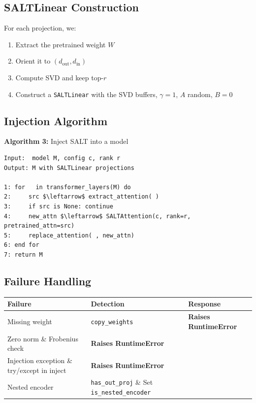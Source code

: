 \subsection{SALTLinear Construction}

For each projection, we:

\begin{enumerate}
\item Extract the pretrained weight $W$
\item Orient it to $(d_\text{out}, d_\text{in})$
\item Compute SVD and keep top-$r$
\item Construct a \texttt{SALTLinear} with the SVD buffers, $\gamma = 1$, $A$ random,
  $B = 0$

\end{enumerate}
\subsection{Injection Algorithm}

\textbf{Algorithm 3:} Inject SALT into a model
\begin{lstlisting}
Input:  model M, config c, rank r
Output: M with SALTLinear projections

1: for   in transformer_layers(M) do
2:     src $\leftarrow$ extract_attention( )
3:     if src is None: continue
4:     new_attn $\leftarrow$ SALTAttention(c, rank=r, pretrained_attn=src)
5:     replace_attention( , new_attn)
6: end for
7: return M
\end{lstlisting}

\subsection{Failure Handling}

\begin{table}[H]
\centering
\small
\begin{tabular}{lll}
\toprule
\textbf{Failure} & \textbf{Detection} & \textbf{Response} \\
\midrule
Missing weight & \texttt{copy\_weights} & \textbf{Raises RuntimeError} \\
Zero norm \& Frobenius check & \textbf{Raises RuntimeError} \\
Injection exception \& try/except in inject & \textbf{Raises RuntimeError} \\
Nested encoder & \texttt{has\_out\_proj} \& Set \texttt{is\_nested\_encoder} \\
\bottomrule
\end{tabular}
\end{table}

